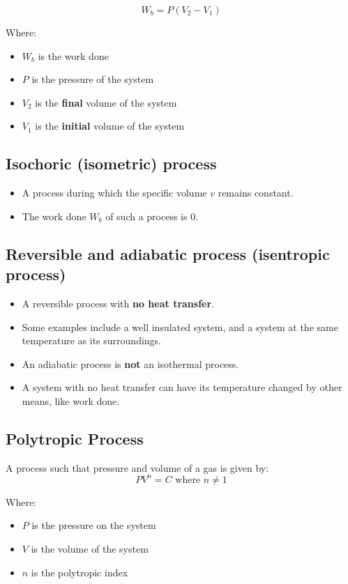 \documentclass[11pt]{article}
\begin{document}
\[W_b = P \left(V_2 - V_1 \right)\]

Where:
\begin{itemize}
\item \(W_b\) is the work done
\item \(P\) is the pressure of the system
\item \(V_2\) is the \textbf{final} volume of the system
\item \(V_1\) is the \textbf{initial} volume of the system
\end{itemize}

\subsection{Isochoric (isometric) process}
\label{sec:org2512847}
\begin{itemize}
\item A process during which the specific volume \(v\) remains constant.
\item The work done \(W_b\) of such a process is 0.
\end{itemize}

\subsection{Reversible and adiabatic process (isentropic process)}
\label{sec:org30c51c8}
\begin{itemize}
\item A reversible process with \textbf{no heat transfer}.
\item Some examples include a well insulated system, and a system at the same temperature as its surroundings.
\item An adiabatic process is \textbf{not} an isothermal process.
\item A system with no heat transfer can have its temperature changed by other means, like work done.
\end{itemize}

\subsection{Polytropic Process}
\label{sec:org82759c2}
A process such that pressure and volume of a gas is given by:
\[PV^n = C \text{ where } n \ne 1\]

Where:
\begin{itemize}
\item \(P\) is the pressure on the system
\item \(V\) is the volume of the system
\item \(n\) is the polytropic index
\end{itemize}
\end{document}
